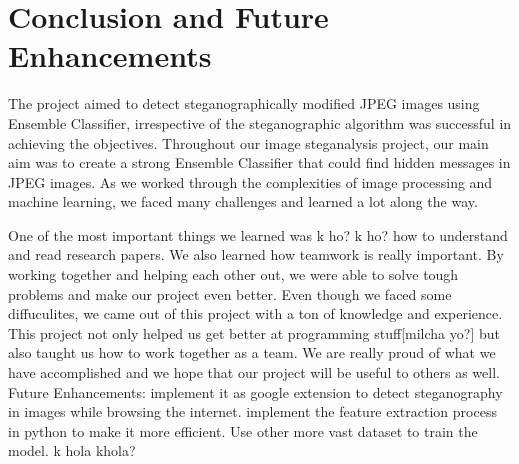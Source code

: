 \chapter{Conclusion and Future Enhancements}
The project aimed to detect steganographically modified JPEG images using Ensemble Classifier, irrespective of the steganographic algorithm was successful in achieving the objectives. Throughout our image steganalysis project, our main aim was to create a strong Ensemble Classifier that could find hidden messages in JPEG images. As we worked through the complexities of image processing and machine learning, we faced many challenges and learned a lot along the way.

One of the most important things we learned was k ho? k ho?  how to understand and read research papers. We also learned how teamwork is really important. By working together and helping each other out, we were able to solve tough problems and make our project even better. Even though we faced some diffuculites, we came out of this project with a ton of knowledge and experience. This project not only helped us get better at programming stuff[milcha yo?] but also taught us how to work together as a team. We are really proud of what we have accomplished and we hope that our project will be useful to others as well.
Future Enhancements:
implement it as google extension to detect steganography in images while browsing the internet.
implement the feature extraction process in python to make it more efficient.
Use other more vast dataset to train the model.
k hola khola?
\clearpage

